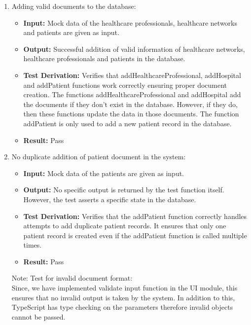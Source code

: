 \documentclass[12pt, titlepage]{article}
\begin{document}
  \begin{enumerate}
    \item Adding valid documents to the database:
      \begin{itemize}
        \item \textbf{Input:} Mock data of the healthcare professionals, healthcare networks and patients are given as input.  
        \item \textbf{Output:} Successful addition of valid information of healthcare networks, healthcare professionals and patients in the database. 
        \item \textbf{Test Derivation:} Verifies that addHealthcareProfessional, addHospital and addPatient functions work correctly ensuring proper document creation. The functions addHealthcareProfessional and addHospital add the documents if they don't exist in the database. However, if they do, then these functions update the data in those documents. The function addPatient is only used to add a new patient record in the database.
        \item \textbf{Result:} Pass 
      \end{itemize}

    \item No duplicate addition of patient document in the system:
      \begin{itemize}
        \item \textbf{Input:} Mock data of the patients are given as input.  
        \item \textbf{Output:} No specific output is returned by the test function itself. However, the test asserts a specific state in the database. 
        \item \textbf{Test Derivation:} Verifies that the addPatient function correctly handles attempts to add duplicate patient records. It ensures that only one patient record is created even if the addPatient function is called multiple times.
        \item \textbf{Result:} Pass
      \end{itemize}

      Note: Test for invalid document format: \\
      Since, we have implemented validate input function in the UI module, this ensures that no invalid output is taken by the system. In addition to this, TypeScript has type checking on the parameters therefore invalid objects cannot be passed.


\end{enumerate}
\end{document}
